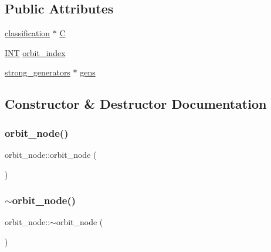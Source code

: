 \subsection*{Public Attributes}
\begin{DoxyCompactItemize}
\item 
\mbox{\hyperlink{classclassification}{classification}} $\ast$ \mbox{\hyperlink{classorbit__node_ae7271bc8e762406e0b94f208a2b99230}{C}}
\item 
\mbox{\hyperlink{galois_8h_a09fddde158a3a20bd2dcadb609de11dc}{I\+NT}} \mbox{\hyperlink{classorbit__node_a4565d1b24e3cf2c0edb83c9d6e992ba9}{orbit\+\_\+index}}
\item 
\mbox{\hyperlink{classstrong__generators}{strong\+\_\+generators}} $\ast$ \mbox{\hyperlink{classorbit__node_a8c7e073aa3d5cf44690dd518b0f9414d}{gens}}
\end{DoxyCompactItemize}


\subsection{Constructor \& Destructor Documentation}
\mbox{\label{classorbit__node_ae8406bf12637d61a8709e2adb62829b0}} 
\subsubsection{\texorpdfstring{orbit\+\_\+node()}{orbit\_node()}}
{\footnotesize\ttfamily orbit\+\_\+node\+::orbit\+\_\+node (\begin{DoxyParamCaption}{ }\end{DoxyParamCaption})}

\mbox{\label{classorbit__node_afdc3c9464a5706d6a6c8888ff44f0a4c}} 
\subsubsection{\texorpdfstring{$\sim$orbit\+\_\+node()}{~orbit\_node()}}
{\footnotesize\ttfamily orbit\+\_\+node\+::$\sim$orbit\+\_\+node (\begin{DoxyParamCaption}{ }\end{DoxyParamCaption})}



